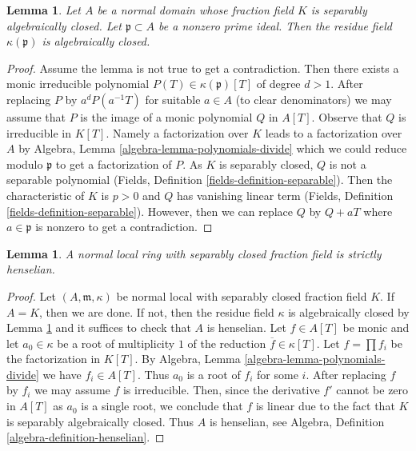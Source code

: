 \documentclass{stacks-project}
\theoremstyle{plain}
\newtheorem{lemma}[subsection]{Lemma}
\theoremstyle{definition}
\theoremstyle{remark}
\numberwithin{equation}{subsection}
\begin{document}
\begin{lemma}
\label{lemma-get-algebraic-closure}
Let $A$ be a normal domain whose fraction field $K$ is separably algebraically
closed. Let $\mathfrak p \subset A$ be a nonzero prime ideal.
Then the residue field $\kappa(\mathfrak p)$ is algebraically closed.
\end{lemma}

\begin{proof}
Assume the lemma is not true to get a contradiction. Then there exists a
monic irreducible polynomial $P(T) \in \kappa(\mathfrak p)[T]$ of
degree $d > 1$. After replacing $P$ by $a^d P(a^{-1}T)$ for suitable $a \in A$
(to clear denominators) we may assume that $P$ is the image of a
monic polynomial $Q$ in $A[T]$. Observe that $Q$ is irreducible in
$K[T]$. Namely a factorization over $K$ leads to a factorization
over $A$ by Algebra, Lemma \ref{algebra-lemma-polynomials-divide}
which we could reduce modulo $\mathfrak p$ to get a factorization of $P$.
As $K$ is separably closed, $Q$ is not a separable polynomial
(Fields, Definition \ref{fields-definition-separable}).
Then the characteristic of $K$ is $p > 0$ and $Q$ has
vanishing linear term (Fields, Definition \ref{fields-definition-separable}).
However, then we can replace $Q$ by
$Q + a T$ where $a \in \mathfrak p$ is nonzero to get a contradiction.
\end{proof}

\begin{lemma}
\label{lemma-normal-local-domain-separablly-closed-fraction-field}
A normal local ring with separably closed fraction field is
strictly henselian.
\end{lemma}

\begin{proof}
Let $(A, \mathfrak m, \kappa)$ be normal local with separably
closed fraction field $K$. If $A = K$, then we are done. If not,
then the residue field $\kappa$ is algebraically closed
by Lemma \ref{lemma-get-algebraic-closure} and it suffices to
check that $A$ is henselian.
Let $f \in A[T]$ be monic and let $a_0 \in \kappa$ be a root
of multiplicity $1$ of the reduction $\overline{f} \in \kappa[T]$.
Let $f = \prod f_i$ be the factorization in $K[T]$.
By Algebra, Lemma \ref{algebra-lemma-polynomials-divide} we have
$f_i \in A[T]$. Thus $a_0$ is a root of $f_i$ for some $i$.
After replacing $f$ by $f_i$ we may assume $f$ is irreducible.
Then, since the derivative $f'$ cannot be zero in $A[T]$
as $a_0$ is a single root, we conclude that $f$ is linear
due to the fact that $K$ is separably algebraically closed.
Thus $A$ is henselian, see
Algebra, Definition \ref{algebra-definition-henselian}.
\end{proof}
\end{document}
